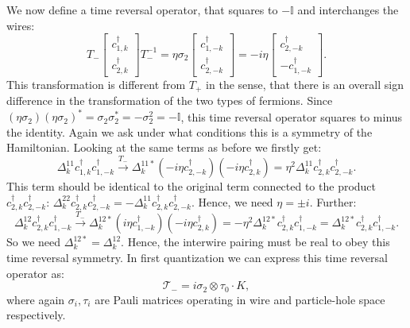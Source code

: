 We now define a time reversal operator, that squares to $-\mathbb{I}$ and interchanges the wires:
\begin{equation}
T_-\begin{bmatrix} c^\dagger_{1,k} \\ c^\dagger_{2,k} \end{bmatrix} T_-^{-1} = \eta\sigma_2 \begin{bmatrix} c^\dagger_{1,-k} \\ c^\dagger_{2,-k} \end{bmatrix} = -i\eta\begin{bmatrix} c^\dagger_{2,-k} \\ - c^\dagger_{1,-k} \end{bmatrix}.\nonumber
\end{equation} 
This transformation is different from $T_+$ in the sense, that there is an overall sign difference in the transformation of the two types of fermions. Since $(\eta \sigma_2)(\eta \sigma_2)^* = \sigma_2\sigma_2^* = - \sigma_2^2 = - \mathbb{I}$, this time reversal operator squares to minus the identity. Again we ask under what conditions this is a symmetry of the Hamiltonian. Looking at the same terms as before we firstly get:
\begin{equation}
\Delta^{11}_k c^\dagger_{1,k}c^\dagger_{1,-k} \overset{T_-}{\to} \Delta^{11*}_k \left(-i\eta c^\dagger_{2,-k}\right)\left(-i\eta c^\dagger_{2,k}\right) = \eta^2\Delta^{11}_k c^\dagger_{2,k}c^\dagger_{2,-k}. \nonumber
\end{equation}
This term should be identical to the original term connected to the product $c^\dagger_{2,k}c^\dagger_{2,-k}$: $\Delta^{22}_k c^\dagger_{2,k}c^\dagger_{2,-k} = -\Delta^{11}_k c^\dagger_{2,k}c^\dagger_{2,-k}$. Hence, we need $\eta = \pm i$. Further:
\begin{equation}
\Delta^{12}_k c^\dagger_{2,k}c^\dagger_{1,-k} \overset{T_-}{\to} \Delta^{12*}_k \left(i\eta c^\dagger_{1,-k}\right)\left(-i\eta c^\dagger_{2,k}\right) = -\eta^2 \Delta^{12*}_k c^\dagger_{2,k}c^\dagger_{1,-k} = \Delta^{12*}_k c^\dagger_{2,k}c^\dagger_{1,-k}. \nonumber
\end{equation}
So we need $\Delta^{12*}_k = \Delta^{12}_k$. Hence, the interwire pairing must be real to obey this time reversal symmetry. In first quantization we can express this time reversal operator as:
\begin{equation}
\mathcal{T}_- = i\sigma_2\otimes\tau_0 \cdot K, 
\label{eq.2wiresTminuswireexchangefirstquantization}
\end{equation}
where again $\sigma_i, \tau_i$ are Pauli matrices operating in wire and particle-hole space respectively. 

